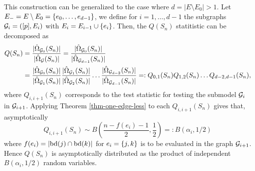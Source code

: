 This construction can be generalized to the case where $d = |E \setminus E_0| > 1$. Let $E_- = E \setminus E_0 = {\left\{e_0, \ldots, e_{d-1}\right\}}$, we define for $i = 1, \ldots, d-1$ the subgraphs ${\mathcal{G}}_i = ([p], E_i)$ with $E_i = E_{i-1} \cup {\left\{e_i\right\}}$. Then, the $Q(S_n)$ statitistic can be decomposed as 
\begin{align*}
    Q(S_n) 
    &= \frac{|\hat\Omega_{{\mathcal{G}}_0}(S_n)|}{|\hat\Omega_{{\mathcal{G}}}(S_n)|}
    = \frac{|\hat\Omega_{{\mathcal{G}}_0}(S_n)|}{|\hat\Omega_{{\mathcal{G}}_{d-1}}(S_n)|} \\
    &= \frac{|\hat\Omega_{{\mathcal{G}}_0}(S_n)|}{|\hat\Omega_{{\mathcal{G}}_1}(S_n)|}
    \frac{|\hat\Omega_{{\mathcal{G}}_1}(S_n)|}{|\hat\Omega_{{\mathcal{G}}_2}(S_n)|}
    \ldots
    \frac{|\hat\Omega_{{\mathcal{G}}_{d-2}}(S_n)|}{|\hat\Omega_{{\mathcal{G}}_{d-1}}(S_n)|}
    =: Q_{0,1}(S_n)Q_{1,2}(S_n) \ldots Q_{d-2, d-1}(S_n),
\end{align*}
where $Q_{i, i+1}(S_n)$ corresponds to the test statistic for testing the submodel ${\mathcal{G}}_i$ in ${\mathcal{G}}_{i+1}$. Applying Theorem \ref{thm-one-edge-less} to each $Q_{i, i+1}(S_n)$ gives that, asymptotically
\begin{equation*}
    Q_{i, i+1}(S_n) \sim B\left(\frac{n - f(e_i) - 1}{2}, \frac{1}{2} \right) =: B(\alpha_i, 1/2)
\end{equation*}
where $f(e_i) = |{\textrm{bd}}(j) \cap {\textrm{bd}}(k)|$ for $e_i = {\left\{j, k\right\}}$ is to be evaluated in the graph ${\mathcal{G}}_{i+1}$. Hence $Q(S_n)$ is asymptotically distributed as the product of independent $B(\alpha_i, 1/2)$ random variables.
